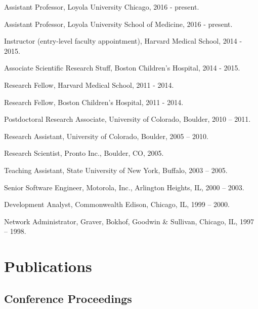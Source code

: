 \documentclass[letterpaper]{article}
\renewenvironment{itemize}{
  \begin{list}{}{
    \setlength{\leftmargin}{1.5em}
  }
}{
  \end{list}
}
\begin{document}
\begin{itemize}
\item Assistant Professor, Loyola University Chicago, 2016 - present.
\item Assistant Professor, Loyola University School of Medicine, 2016 - present.
\item Instructor (entry-level faculty appointment), Harvard Medical School, 2014 - 2015.
\item Associate Scientific Research Stuff, Boston Children's Hospital, 2014 - 2015.
\item Research Fellow, Harvard Medical School, 2011 - 2014.
\item Research Fellow, Boston Children's Hospital, 2011 - 2014.
\item Postdoctoral Research Associate, University of Colorado, Boulder, 2010 -- 2011.
\item Research Assistant, University of Colorado, Boulder, 2005 -- 2010.
\item Research Scientist, Pronto Inc., Boulder, CO, 2005.
\item Teaching Assistant, State University of New York, Buffalo, 2003 -- 2005.
\item Senior Software Engineer, Motorola, Inc., Arlington Heights, IL, 2000 -- 2003.
\item Development Analyst, Commonwealth Edison, Chicago, IL, 1999 -- 2000.
\item Network Administrator, Graver, Bokhof, Goodwin \& Sullivan, Chicago, IL, 1997 -- 1998.
\end{itemize}

\section*{Publications}

\subsection*{Conference Proceedings}
\end{document}
